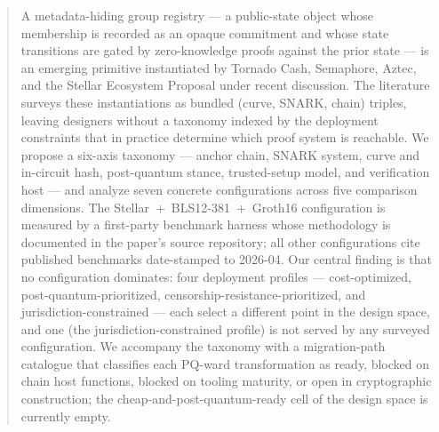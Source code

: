 \begin{abstract}
A metadata-hiding group registry --- a public-state object whose
membership is recorded as an opaque commitment and whose state
transitions are gated by zero-knowledge proofs against the prior state
--- is an emerging primitive instantiated by Tornado Cash, Semaphore,
Aztec, and the Stellar Ecosystem Proposal under recent discussion.
The literature surveys these instantiations as bundled
(curve, SNARK, chain) triples, leaving designers without a taxonomy
indexed by the deployment constraints that in practice determine which
proof system is reachable. We propose a six-axis taxonomy --- anchor
chain, SNARK system, curve and in-circuit hash, post-quantum stance,
trusted-setup model, and verification host --- and analyze seven
concrete configurations across five comparison dimensions. The
Stellar~+~BLS12-381~+~Groth16 configuration is measured by a
first-party benchmark harness whose methodology is documented in the
paper's source repository;
all other configurations cite published benchmarks date-stamped to
2026-04. Our central finding is that no configuration dominates: four
deployment profiles --- cost-optimized, post-quantum-prioritized,
censorship-resistance-prioritized, and jurisdiction-constrained ---
each select a different point in the design space, and one (the
jurisdiction-constrained profile) is not served by any surveyed
configuration. We accompany the taxonomy with a migration-path
catalogue that classifies each PQ-ward transformation as ready,
blocked on chain host functions, blocked on tooling maturity, or open
in cryptographic construction; the cheap-and-post-quantum-ready cell
of the design space is currently empty.
\end{abstract}
